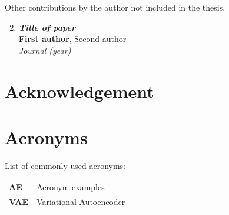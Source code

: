 \documentclass[electronic]{kthesis}
\begin{document}
	Other contributions by the author not included in the thesis.
	\begin{enumerate}[I]
		\setcounter{enumi}{1}
		\item \textbf{\textit{Title of paper}} \\
		\textbf{First author}, Second author \\
		\textit{Journal (year)}
	\end{enumerate}
	\chapter{Acknowledgement}
	\noindent \lipsum[1]
	
	\chapter{Acronyms}
	List of commonly used acronyms: \\
	
	\begin{tabular}{llll}
		\textbf{AE}		&	Acronym examples \\
		\textbf{VAE}		&	Variational Autoencoder \\
		
	\end{tabular}
	
	
	\mainmatter %
	\tableofcontents
	
\end{document}

